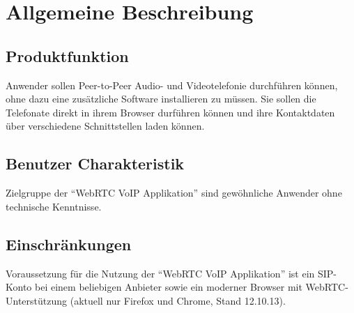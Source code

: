 \chapter{Allgemeine Beschreibung}
\label{requirements} 


\section{Produktfunktion}
Anwender sollen Peer-to-Peer Audio- und Videotelefonie durchführen können, ohne
dazu eine zusätzliche Software installieren zu müssen. Sie sollen die Telefonate
direkt in ihrem Browser durführen können und ihre Kontaktdaten über verschiedene
Schnittstellen laden können.

\section{Benutzer Charakteristik}
Zielgruppe der ``WebRTC VoIP Applikation'' sind gewöhnliche Anwender ohne technische Kenntnisse.

\section{Einschränkungen}
Voraussetzung für die Nutzung der ``WebRTC VoIP Applikation'' ist ein SIP-Konto
bei einem beliebigen Anbieter sowie ein moderner Browser mit
WebRTC-Unterstützung (aktuell nur Firefox und Chrome, Stand 12.10.13).


